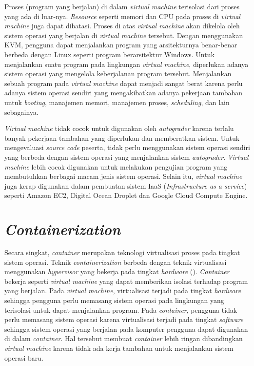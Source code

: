 \par Proses (program yang berjalan) di dalam \textit{virtual machine} terisolasi dari proses yang ada di luar-nya. \textit{Resource} seperti memori dan CPU pada proses di \textit{virtual machine} juga dapat dibatasi. Proses di atas \textit{virtual machine} akan dikelola oleh sistem operasi yang berjalan di \textit{virtual machine} tersebut. Dengan menggunakan KVM, pengguna dapat menjalankan program yang arsitekturnya benar-benar berbeda dengan Linux seperti program berarsitektur Windows. Untuk menjalankan suatu program pada lingkungan \textit{virtual machine}, diperlukan adanya sistem operasi yang mengelola keberjalanan program tersebut. Menjalankan sebuah program pada \textit{virtual machine} dapat menjadi sangat berat karena perlu adanya sistem operasi sendiri yang mengakibatkan adanya pekerjaan tambahan untuk \textit{booting}, manajemen memori, manajemen proses, \textit{scheduling}, dan lain sebagainya.

\par \textit{Virtual machine} tidak cocok untuk digunakan oleh \textit{autograder} karena terlalu banyak pekerjaan tambahan yang diperlukan dan memberatkan sistem. Untuk mengevaluasi \textit{source code} peserta, tidak perlu menggunakan sistem operasi sendiri yang berbeda dengan sistem operasi yang menjalankan sistem \textit{autograder}. \textit{Virtual machine} lebih cocok digunakan untuk melakukan pengujian program yang membutuhkan berbagai macam jenis sistem operasi. Selain itu, \textit{virtual machine} juga kerap digunakan dalam pembuatan sistem IaaS (\textit{Infrastructure as a service}) seperti Amazon EC2, Digital Ocean Droplet dan Google Cloud Compute Engine.

\section{\textit{Containerization}}


\par Secara singkat, \textit{container} merupakan teknologi virtualisasi proses pada tingkat sistem operasi. Teknik \textit{containerization} berbeda dengan teknik virtualisasi menggunakan \textit{hypervisor} yang bekerja pada tingkat \textit{hardware} (\cite{merkeldocker}). \textit{Container} bekerja seperti \textit{virtual machine} yang dapat memberikan isolasi terhadap program yang berjalan. Pada \textit{virtual machine}, virtualisasi terjadi pada tingkat \textit{hardware} sehingga pengguna perlu memasang sistem operasi pada lingkungan yang terisolasi untuk dapat menjalankan program. Pada \textit{container}, pengguna tidak perlu memasang sistem operasi karena virtualisasi terjadi pada tingkat \textit{software} sehingga sistem operasi yang berjalan pada komputer pengguna dapat digunakan di dalam \textit{container}. Hal tersebut membuat \textit{container} lebih ringan dibandingkan \textit{virtual machine} karena tidak ada kerja tambahan untuk menjalankan sistem operasi baru.

